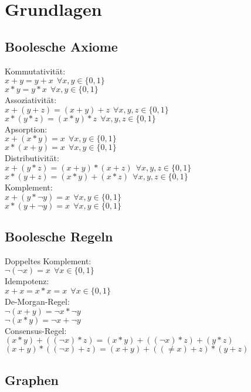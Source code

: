 \documentclass{scrartcl}[10pt]
\begin{document}
\tableofcontents
\pagebreak
\section{Grundlagen}
\subsection{Boolesche Axiome}
 Kommutativit\"at:\\
 $x+y = y+x \ \ \forall x,y \in \{0,1\}$\\
 $x*y = y*x \ \ \forall x,y \in \{0,1\}$\\
 Assoziativit\"at:\\
 $x+(y+z) = (x+y)+z \ \ \forall x,y,z \in \{0,1\} $\\
 $x*(y*z) = (x*y)*z \ \ \forall x,y,z \in \{0,1\} $\\
 Apsorption:\\
 $ x+(x*y) = x \ \ \forall x,y \in \{0,1\}$\\
 $ x*(x+y) = x \ \ \forall x,y \in \{0,1\}$\\
 Distributivit\"at:\\ 
 $ x + (y*z) = (x+y) * (x+z) \ \ \forall x,y,z \in \{0,1\}$\\
 $ x * (y+z) = (x*y) + (x*z) \ \ \forall x,y,z \in \{0,1\}$\\
 Komplement:\\
 $ x+(y*\neg y) = x \ \ \forall x,y \in \{0,1\}$\\
 $ x*(y+\neg y) = x \ \ \forall x,y \in \{0,1\}$\\
\subsection{Boolesche Regeln}
Doppeltes Komplement:\\
$ \neg (\neg x) = x \ \ \forall x\in \{0,1\}$\\
Idempotenz:\\
$ x+x = x*x = x \ \ \forall x\in \{0,1\}$\\
De-Morgan-Regel:\\
$ \neg(x+y) = \neg x * \neg y$\\
$ \neg(x*y) = \neg x + \neg y$\\
Consensus-Regel:\\
$ (x*y)+((\neg x)*z) = (x*y)+((\neg x)*z) + (y*z)$\\
$ (x+y)*((\neg x)+z) = (x+y)+((\neq x)+z) * (y+z)$
\subsection{Graphen}
\end{document}
